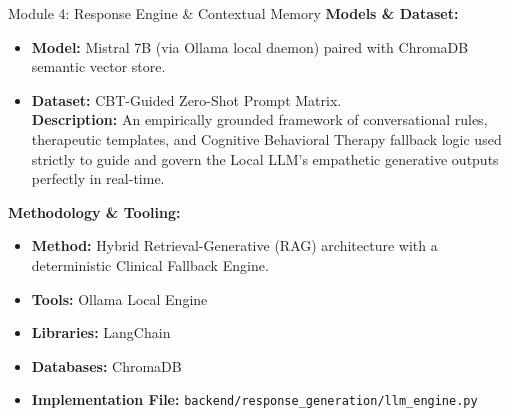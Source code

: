 \documentclass[11pt]{beamer}
\begin{document}
\begin{frame}{Module 4: Response Engine \& Contextual Memory}
    \justifying
    \textbf{Models \& Dataset:}
    \begin{itemize}
        \item \textbf{Model:} Mistral 7B (via Ollama local daemon) paired with ChromaDB semantic vector store.
        \item \textbf{Dataset:} CBT-Guided Zero-Shot Prompt Matrix. \\ \textbf{Description:} An empirically grounded framework of conversational rules, therapeutic templates, and Cognitive Behavioral Therapy fallback logic used strictly to guide and govern the Local LLM's empathetic generative outputs perfectly in real-time.
    \end{itemize}
    \vspace{0.2cm}
    \textbf{Methodology \& Tooling:}
    \begin{itemize}
        \item \textbf{Method:} Hybrid Retrieval-Generative (RAG) architecture with a deterministic Clinical Fallback Engine.
        \item \textbf{Tools:} Ollama Local Engine
        \item \textbf{Libraries:} LangChain
        \item \textbf{Databases:} ChromaDB
        \item \textbf{Implementation File:} \texttt{backend/response\_generation/llm\_engine.py}
    \end{itemize}
\end{frame}
\end{document}
